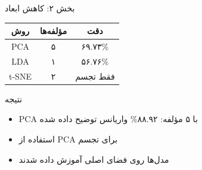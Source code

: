 \documentclass[aspectratio=169]{beamer}
\begin{document}
\begin{frame}{بخش ۲: کاهش ابعاد}
\begin{table}[h]
\centering
\small
\begin{tabular}{|c|c|c|}
\hline
\textbf{روش} & \textbf{مؤلفه‌ها} & \textbf{دقت} \\
\hline
PCA & ۵ & ۶۹.۷۳\% \\
\hline
LDA & ۱ & ۵۶.۷۶\% \\
\hline
t-SNE & ۲ & فقط تجسم \\
\hline
\end{tabular}
\end{table}

\begin{block}{نتیجه}
\begin{itemize}
\item PCA با ۵ مؤلفه: ۸۸.۹۲\% واریانس توضیح داده شده
\item استفاده از PCA برای تجسم
\item مدل‌ها روی فضای اصلی آموزش داده شدند
\end{itemize}
\end{block}
\end{frame}
\end{document}
